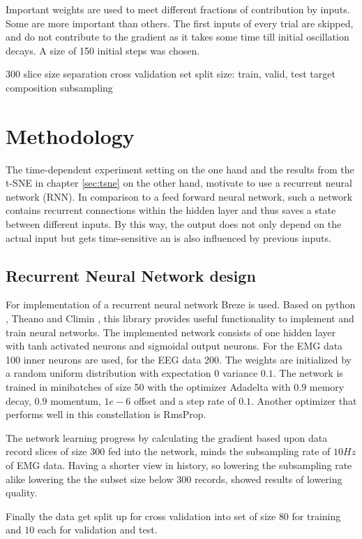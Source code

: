 \documentclass{article} %
\begin{document}
Important weights are used to meet different fractions of contribution by inputs. Some are more important than others. The first inputs of every trial are skipped, and do not contribute to the gradient as it takes some time till initial oscillation decays. A size of 150 initial steps was chosen.

300 slice size separation
cross validation set split size: train, valid, test
target composition
subsampling

\section{Methodology}
The time-dependent experiment setting on the one hand and the results from the t-SNE in chapter \ref{sec:tsne} on the other hand, motivate to use a recurrent neural network (RNN). In comparison to a feed forward neural network, such a network contains recurrent connections within the hidden layer and thus saves a state between different inputs. By this way, the output does not only depend on the actual input but gets time-sensitive an is also influenced by previous inputs.

\subsection{Recurrent Neural Network design}
For implementation of a recurrent neural network Breze \cite{breze} is used. Based on python \cite{python}, Theano \cite{theano} and Climin \cite{climin}, this library provides useful functionality to implement and train neural networks. The implemented network consists of one hidden layer with tanh activated neurons and sigmoidal output neurons. For the EMG data 100 inner neurons are used, for the EEG data 200. The weights are initialized by a random uniform distribution with  expectation $0$ variance $0.1$. The network is trained in minibatches of size 50 with the optimizer Adadelta with $0.9$ memory decay, $0.9$ momentum, $1e-6$ offset and a step rate of $0.1$. Another optimizer that performs well in this constellation is RmsProp.

The network learning progress by calculating the gradient based upon data record slices of size $300$ fed into the network, minds the subsampling rate of $10Hz$ of EMG data. Having a shorter view in history, so lowering the subsampling rate alike lowering the the subset size below $300$ records, showed results of lowering quality.

Finally the data get split up for cross validation into set of size $80$ for training and $10$ each for validation and test.
\end{document}
